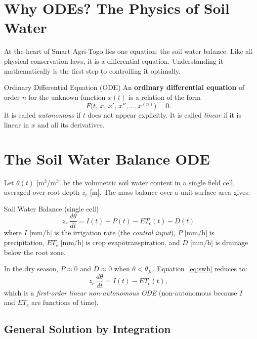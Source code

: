 \documentclass[12pt,a4paper,openany]{book}
\begin{document}
\section{Why ODEs? The Physics of Soil Water}

At the heart of Smart Agri-Togo lies one equation: the soil water balance. Like all physical conservation laws, it is a differential equation. Understanding it mathematically is the first step to controlling it optimally.

\begin{defbox}{Ordinary Differential Equation (ODE)}
An \textbf{ordinary differential equation} of order $n$ for the unknown function
$x(t)$ is a relation of the form
\[F\bigl(t,\,x,\,x',\,x'',\ldots,x^{(n)}\bigr)=0.\]
It is called \textit{autonomous} if $t$ does not appear explicitly.
It is called \textit{linear} if it is linear in $x$ and all its derivatives.
\end{defbox}

\section{The Soil Water Balance ODE}

Let $\theta(t)$ [m$^3$/m$^3$] be the volumetric soil water content in a single field cell, averaged over root depth $z_r$ [m]. The mass balance over a unit surface area gives:

\begin{thmbox}{Soil Water Balance (single cell)}
\begin{equation}
  z_r\,\frac{d\theta}{dt} = I(t) + P(t) - ET_c(t) - D(t)
  \label{eq:swb}
\end{equation}
where $I$ [mm/h] is the irrigation rate (the \emph{control input}),
$P$ [mm/h] is precipitation, $ET_c$ [mm/h] is crop evapotranspiration,
and $D$ [mm/h] is drainage below the root zone.
\end{thmbox}

In the dry season, $P\approx 0$ and $D\approx 0$ when $\theta < \theta_{fc}$. Equation~\eqref{eq:swb} reduces to:
\begin{equation}
  z_r\,\frac{d\theta}{dt} = I(t) - ET_c(t),
  \label{eq:swb_dry}
\end{equation}
which is a \textit{first-order linear non-autonomous ODE} (non-autonomous because $I$ and $ET_c$ are functions of time).

\subsection{General Solution by Integration}
\end{document}
